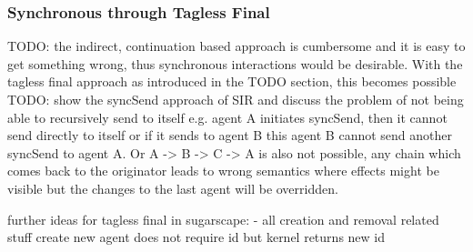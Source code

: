 \subsubsection{Synchronous through Tagless Final}
TODO: the indirect, continuation based approach is cumbersome and it is easy to get something wrong, thus synchronous interactions would be desirable. With the tagless final approach as introduced in the TODO section, this becomes possible
TODO: show the syncSend approach of SIR and discuss the problem of not being able to recursively send to itself e.g. agent A initiates syncSend, then it cannot send directly to itself or if it sends to agent B this agent B cannot send another syncSend to agent A. Or A -> B -> C -> A is also not possible, any chain which comes back to the originator leads to wrong semantics where effects might be visible but the changes to the last agent will be overridden.

further ideas for tagless final in sugarscape:
- all creation and removal related stuff create new agent does not require id but kernel returns new id
